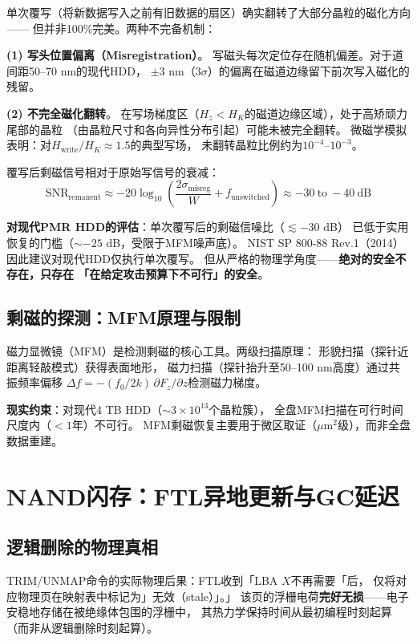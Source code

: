 \documentclass[11pt,a4paper,openany]{book}
\theoremstyle{definition}
\theoremstyle{plain}
\theoremstyle{remark}
\begin{document}
单次覆写（将新数据写入之前有旧数据的扇区）确实翻转了大部分晶粒的磁化方向——
但并非100\%完美。两种不完备机制：

\textbf{(1) 写头位置偏离（Misregistration）}。
写磁头每次定位存在随机偏差。对于道间距50--70 nm的现代HDD，
$\pm 3$ nm（$3\sigma$）的偏离在磁道边缘留下前次写入磁化的残留。

\textbf{(2) 不完全磁化翻转}。
在写场梯度区（$H_z < H_K$的磁道边缘区域），处于高矫顽力尾部的晶粒
（由晶粒尺寸和各向异性分布引起）可能未被完全翻转。
微磁学模拟表明：对$H_{\text{write}}/H_K \approx 1.5$的典型写场，
未翻转晶粒比例约为$10^{-4}$--$10^{-3}$。

覆写后剩磁信号相对于原始写信号的衰减：
\begin{equation}
  \text{SNR}_{\text{remanent}} \approx -20\log_{10}\!\left(
    \frac{2\sigma_{\text{misreg}}}{W} + f_{\text{unswitched}} \right)
  \approx -30\ \text{to}\ -40\ \text{dB}
\end{equation}

\textbf{对现代PMR HDD的评估}：单次覆写后的剩磁信噪比（$\lesssim -30$ dB）
已低于实用恢复的门槛（$\sim -25$ dB，受限于MFM噪声底）。
NIST SP 800-88 Rev.1（2014）因此建议对现代HDD仅执行单次覆写。
但从严格的物理学角度——\textbf{绝对的安全不存在，只存在
「在给定攻击预算下不可行」的安全}。

\subsection{剩磁的探测：MFM原理与限制}

磁力显微镜（MFM）是检测剩磁的核心工具。两级扫描原理：
形貌扫描（探针近距离轻敲模式）获得表面地形，
磁力扫描（探针抬升至50--100 nm高度）通过共振频率偏移
$\Delta f = -(f_0/2k)\,\partial F_z/\partial z$检测磁力梯度。

\textbf{现实约束}：对现代4 TB HDD（$\sim 3 \times 10^{13}$个晶粒簇），
全盘MFM扫描在可行时间尺度内（$<1$年）不可行。
MFM剩磁恢复主要用于微区取证（$\mu$m$^2$级），而非全盘数据重建。

\section{NAND闪存：FTL异地更新与GC延迟}

\subsection{逻辑删除的物理真相}

TRIM/UNMAP命令的实际物理后果：FTL收到「LBA $X$不再需要「后，
仅将对应物理页在映射表中标记为」无效（stale）」。」
该页的浮栅电荷\textbf{完好无损}——电子安稳地存储在被绝缘体包围的浮栅中，
其热力学保持时间从最初编程时刻起算（而非从逻辑删除时刻起算）。
\end{document}
